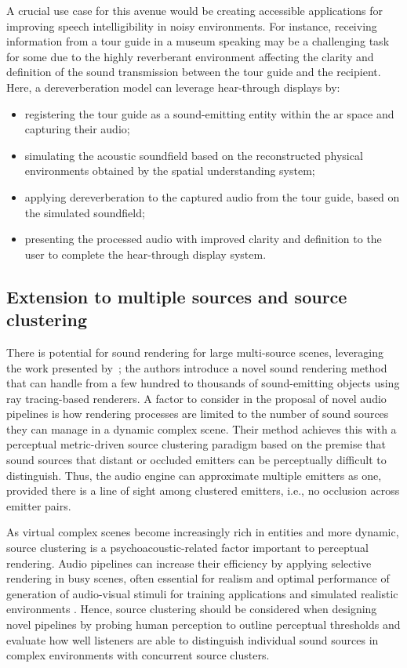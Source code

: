 A crucial use case for this avenue would be creating accessible applications for improving speech intelligibility in noisy environments. For instance, receiving information from a tour guide in a museum speaking may be a challenging task for some due to the highly reverberant environment affecting the clarity and definition of the sound transmission between the tour guide and the recipient. Here, a dereverberation model can leverage hear-through displays by:
\begin{itemize}
    \item registering the tour guide as a sound-emitting entity within the \acrshort{ar} space and capturing their audio;
    \item simulating the acoustic soundfield based on the reconstructed physical environments obtained by the spatial understanding system;
    \item applying dereverberation to the captured audio from the tour guide, based on the simulated soundfield;
    \item presenting the processed audio with improved clarity and definition to the user to complete the hear-through display system.
\end{itemize}

\subsection{Extension to multiple sources and source clustering}
There is potential for sound rendering for large multi-source scenes, leveraging the work presented by~\cite{schissler2016interactive}; the authors introduce a novel sound rendering method that can handle from a few hundred to thousands of sound-emitting objects using ray tracing-based renderers. A factor to consider in the proposal of novel audio pipelines is how rendering processes are limited to the number of sound sources they can manage in a dynamic complex scene. Their method achieves this with a perceptual metric-driven source clustering paradigm based on the premise that sound sources that distant or occluded emitters can be perceptually difficult to distinguish. Thus, the audio engine can approximate multiple emitters as one, provided there is a line of sight among clustered emitters, i.e., no occlusion across emitter pairs.\par
As virtual complex scenes become increasingly rich in entities and more dynamic, source clustering is a psychoacoustic-related factor important to perceptual rendering. Audio pipelines can increase their efficiency by applying selective rendering in busy scenes, often essential for realism and optimal performance of generation of audio-visual stimuli for training applications and simulated realistic environments \citep{Woodward2021}. Hence, source clustering should be considered when designing novel pipelines by probing human perception to outline perceptual thresholds and evaluate how well listeners are able to distinguish individual sound sources in complex environments with concurrent source clusters.\par

